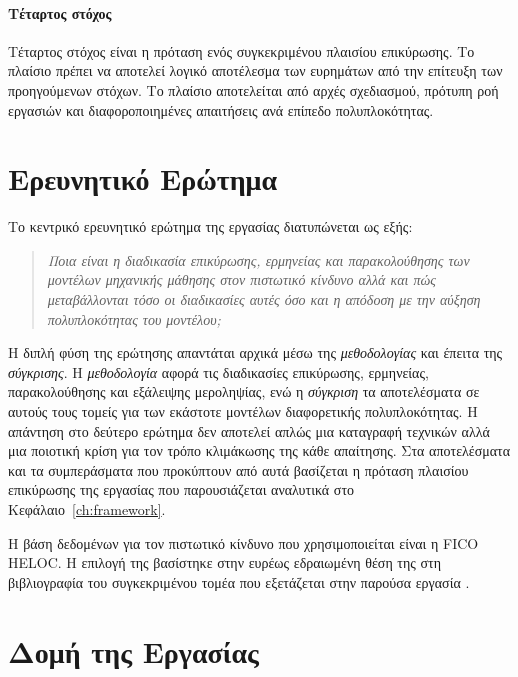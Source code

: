 \paragraph{Τέταρτος στόχος}
Τέταρτος στόχος είναι η πρόταση ενός συγκεκριμένου πλαισίου επικύρωσης. Το
πλαίσιο πρέπει να αποτελεί λογικό αποτέλεσμα των ευρημάτων από την επίτευξη
των προηγούμενων στόχων. Το πλαίσιο αποτελείται από αρχές σχεδιασμού, πρότυπη
ροή εργασιών και διαφοροποιημένες απαιτήσεις ανά επίπεδο πολυπλοκότητας.

\section{Ερευνητικό Ερώτημα}
\label{sec:research_questions}

Το κεντρικό ερευνητικό ερώτημα της εργασίας διατυπώνεται ως εξής:

\begin{quote}
\textit{Ποια είναι η διαδικασία επικύρωσης, ερμηνείας και παρακολούθησης των
μοντέλων μηχανικής μάθησης στον πιστωτικό κίνδυνο αλλά και πώς μεταβάλλονται
τόσο οι διαδικασίες αυτές όσο και η απόδοση με την αύξηση πολυπλοκότητας του μοντέλου;}
\end{quote}

Η διπλή φύση της ερώτησης απαντάται αρχικά μέσω της \emph{μεθοδολογίας} και
έπειτα της \emph{σύγκρισης}. Η \emph{μεθοδολογία} αφορά τις διαδικασίες
επικύρωσης, ερμηνείας, παρακολούθησης και εξάλειψης μεροληψίας, ενώ η
\emph{σύγκριση} τα αποτελέσματα σε αυτούς τους τομείς για των εκάστοτε
μοντέλων διαφορετικής πολυπλοκότητας. Η απάντηση στο δεύτερο ερώτημα δεν
αποτελεί απλώς μια καταγραφή τεχνικών αλλά μια ποιοτική κρίση για τον τρόπο
κλιμάκωσης της κάθε απαίτησης. Στα αποτελέσματα και τα συμπεράσματα που
προκύπτουν από αυτά βασίζεται η πρόταση πλαισίου επικύρωσης της εργασίας που
παρουσιάζεται αναλυτικά στο Κεφάλαιο~\ref{ch:framework}.

Η βάση δεδομένων για τον πιστωτικό κίνδυνο που χρησιμοποιείται είναι η FICO
HELOC. Η επιλογή της βασίστηκε στην ευρέως εδραιωμένη θέση της στη
βιβλιογραφία του συγκεκριμένου τομέα που εξετάζεται στην παρούσα
εργασία \citep{fico2018}.

\section{Δομή της Εργασίας}
\label{sec:structure}

